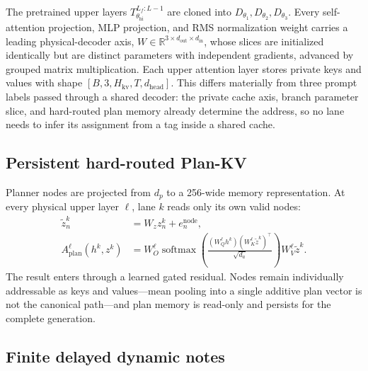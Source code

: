 \documentclass[10pt]{article}
\newcommand{\R}{\mathbb{R}}
\newcommand{\softmax}{\operatorname{softmax}}
\begin{document}
The pretrained upper layers
\(
T_{\theta_{\mathrm{hi}}}^{L_f:L-1}
\)
are cloned into
\(
D_{\theta_1},D_{\theta_2},D_{\theta_3}
\).
Every self-attention projection, MLP projection, and RMS normalization weight
carries a leading physical-decoder axis,
\(W\in\R^{3\times d_{\mathrm{out}}\times d_{\mathrm{in}}}\),
whose slices are initialized identically but are distinct parameters with
independent gradients, advanced by grouped matrix multiplication. Each upper
attention layer stores private keys and values with shape
\(
[B,3,H_{\mathrm{kv}},T,d_{\mathrm{head}}]
\).
This differs materially from three prompt labels passed through a shared
decoder: the private cache axis, branch parameter slice, and hard-routed plan
memory already determine the address, so no lane needs to infer its
assignment from a tag inside a shared cache.

\subsection{Persistent hard-routed Plan-KV}

Planner nodes are projected from \(d_p\) to a 256-wide memory representation.
At every physical upper layer \(\ell\), lane \(k\) reads only its own valid
nodes:
\begin{align}
\widetilde z^k_n &= W_z z^k_n + e^{\mathrm{node}}_n,\\
A^{\ell}_{\mathrm{plan}}(h^k,z^k)
&=W^\ell_O
\softmax\!\left(
\frac{(W^\ell_Q h^k)(W^\ell_K\widetilde z^k)^\top}{\sqrt{d_a}}
\right)
W^\ell_V\widetilde z^k .
\end{align}
The result enters through a learned gated residual. Nodes remain individually
addressable as keys and values---mean pooling into a single additive plan
vector is not the canonical path---and plan memory is read-only and persists
for the complete generation.

\subsection{Finite delayed dynamic notes}
\label{sec:notes}
\end{document}
